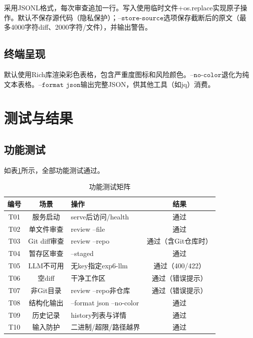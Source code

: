 \documentclass{experimentreport}
\begin{document}
采用JSONL格式，每次审查追加一行。写入使用临时文件+os.replace实现原子操作。默认不保存源代码（隐私保护）；$\texttt{--store-source}$选项保存截断后的原文（最多4000字符diff、2000字符/文件），并输出警告。

\subsection{终端呈现}

默认使用Rich库渲染彩色表格，包含严重度图标和风险颜色。$\texttt{--no-color}$退化为纯文本表格。$\texttt{--format json}$输出完整JSON，供其他工具（如jq）消费。

\section{测试与结果}

\subsection{功能测试}

如表\ref{tab:test-matrix}所示，全部功能测试通过。

\begin{table}[h]
\centering
\caption{功能测试矩阵}
\label{tab:test-matrix}
\begin{tabular}{|c|c|l|c|}
\hline
\textbf{编号} & \textbf{场景} & \textbf{操作} & \textbf{结果} \\
\hline
T01 & 服务启动 & serve后访问/health & 通过 \\
T02 & 单文件审查 & review --file & 通过 \\
T03 & Git diff审查 & review --repo & 通过（含Git仓库时）\\
T04 & 暂存区审查 & --staged & 通过 \\
T05 & LLM不可用 & 无key指定exp6-llm & 通过（400/422）\\
T06 & 空diff & 干净工作区 & 通过（错误提示）\\
T07 & 非Git目录 & review --repo非仓库 & 通过（错误提示）\\
T08 & 结构化输出 & --format json --no-color & 通过 \\
T09 & 历史记录 & history列表与详情 & 通过 \\
T10 & 输入防护 & 二进制/超限/路径越界 & 通过 \\
\hline
\end{tabular}
\end{table}
\end{document}
